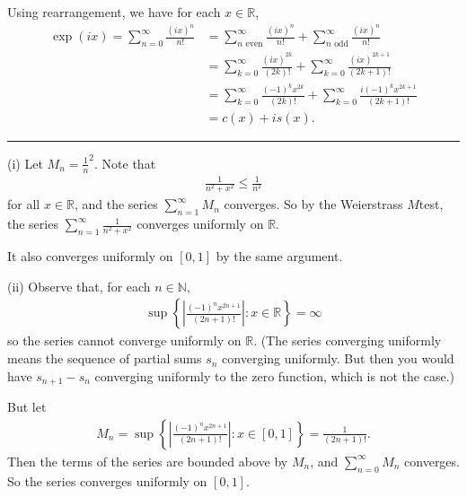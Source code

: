 \documentclass[letterpaper,10pt,english]{jupyterBook}
\begin{document}
\sphinxAtStartPar
Using rearrangement, we have for each \(x\in\mathbb{R}\),
\begin{align*}
\exp(ix) = \sum_{n=0}^\infty\frac{(ix)^n}{n!} &= \sum_{n \text{ even}}^\infty\frac{(ix)^n}{n!}  + \sum_{n \text{ odd}}^\infty\frac{(ix)^n}{n!} \\
&= \sum_{k=0}^\infty\frac{(ix)^{2k}}{(2k)!} + \sum_{k=0}^\infty\frac{(ix)^{2k+1}}{(2k+1)!} \\
&= \sum_{k=0}^\infty\frac{(-1)^kx^{2k}}{(2k)!} + \sum_{k=0}^\infty\frac{i(-1)^kx^{2k+1}}{(2k+1)!} \\
&= c(x) + is(x).
\end{align*}

\bigskip\hrule\bigskip


\sphinxAtStartPar
{\hyperref[\detokenize{Problems:id62}]{}}
(i) Let \(M_n =\frac{1}{n}^2\). Note that
\begin{equation*}
\begin{split}
\frac{1}{n^2+x^2} \leq \frac{1}{n^2}
\end{split}
\end{equation*}
\sphinxAtStartPar
for all \(x\in \mathbb{R}\), and the series \(\sum_{n=1}^\infty M_n\) converges. So by the Weierstrass \(M\)\sphinxhyphen{}test, the series \( \sum_{n=1}^\infty \frac{1}{n^2 +x^2}\) converges uniformly on \(\mathbb{R}\).

\sphinxAtStartPar
It also converges uniformly on \([0,1]\) by the same argument.

\sphinxAtStartPar
(ii) Observe that, for each \(n\in \mathbb{N}\),
\begin{equation*}
\begin{split}
\sup \left\{ \left| \frac{(-1)^nx^{2n+1}}{(2n+1)!} \right| : x\in \mathbb{R} \right\} = \infty
\end{split}
\end{equation*}
\sphinxAtStartPar
so the series cannot converge uniformly on \(\mathbb{R}\). (The series converging uniformly means the sequence
of partial sums \(s_n\) converging uniformly. But then you would have \(s_{n+1}-s_n\) converging uniformly
to the zero function, which is not the case.)

\sphinxAtStartPar
But let
\begin{equation*}
\begin{split}
M_n = \sup \left\{ \left| \frac{(-1)^nx^{2n+1}}{(2n+1)!} \right|  : x\in [0,1] \right\} = \frac{1}{(2n+1)!}.
\end{split}
\end{equation*}
\sphinxAtStartPar
Then the terms of the series are bounded above by \(M_n\), and \(\sum_{n=0}^\infty M_n\) converges. So the series converges uniformly on \([0,1]\).
\end{document}
